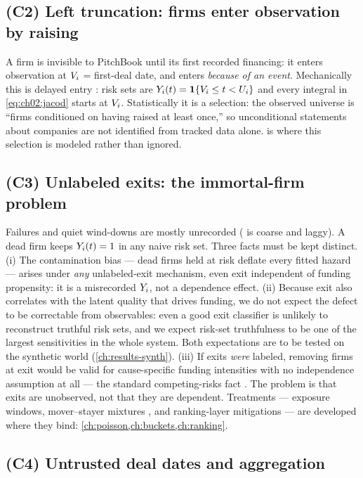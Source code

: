 \subsection*{(C2) Left truncation: firms enter observation by raising}

A firm is invisible to PitchBook until its first recorded financing: it
enters observation at $V_i$ = first-deal date, and enters
\emph{because of an event}. Mechanically this is delayed entry
\citep{keiding1990}: risk sets are $Y_i(t) = \mathbf{1}\{V_i \le t <
U_i\}$ and every integral in \cref{eq:ch02:jacod} starts at $V_i$.
Statistically it is a selection: the observed universe is ``firms
conditioned on having raised at least once,'' so unconditional statements
about companies are not identified from tracked data alone.
 is where this selection is modeled rather than ignored.

\subsection*{(C3) Unlabeled exits: the immortal-firm problem}

Failures and quiet wind-downs are mostly unrecorded (
is coarse and laggy). A dead firm keeps $Y_i(t)=1$ in any naive risk
set. Three facts must be kept distinct. (i) The contamination bias ---
dead firms held at risk deflate every fitted hazard --- arises under
\emph{any} unlabeled-exit mechanism, even exit independent of funding
propensity: it is a misrecorded $Y_i$, not a dependence effect.
(ii) Because exit also correlates with the latent quality that drives
funding, we do not expect the defect to be correctable from observables:
even a good exit classifier is unlikely to reconstruct truthful risk sets,
and we expect risk-set truthfulness to be one of the largest sensitivities
in the whole system. Both expectations are to be tested on the synthetic
world (\cref{ch:results-synth}). (iii) If
exits \emph{were} labeled, removing firms at exit would be valid for
cause-specific funding intensities with no independence assumption at all
--- the standard competing-risks fact \citep{putter2007}. The problem is
that exits are unobserved, not that they are dependent. Treatments ---
exposure windows, mover--stayer mixtures \citep{farewell1982}, and
ranking-layer mitigations --- are developed where they bind:
\cref{ch:poisson,ch:buckets,ch:ranking}.

\subsection*{(C4) Untrusted deal dates and aggregation}

